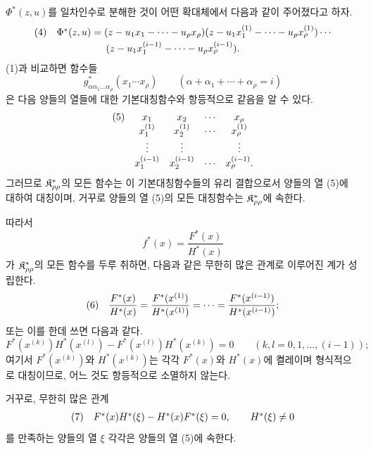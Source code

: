 $\Phi^*(z,u)$를 일차인수로 분해한 것이 어떤 확대체에서 다음과 같이 주어졌다고 하자.
\[
\begin{array}{@{}l@{\quad}l@{}}
(4)& \Phi^*(z,u)=(z-u_1x_1-\cdots-u_\rho x_\rho)(z-u_1x_1^{(1)}-\cdots-u_\rho x_\rho^{(1)})\cdots\\[0.25em]
& \qquad\qquad\quad (z-u_1x_1^{(i-1)}-\cdots-u_\rho x_\rho^{(i-1)}).
\end{array}
\]
(1)과 비교하면 함수들
\[
g^*_{\alpha\alpha_1\ldots\alpha_\rho}(x_1\cdots x_\rho)\qquad(\alpha+\alpha_1+\cdots+\alpha_\rho=i)
\]
은 다음 양들의 열들에 대한 기본대칭함수와 항등적으로 같음을 알 수 있다.
\[
\begin{array}{@{}l@{\quad}cccc@{}}
(5)&x_1&x_2&\cdots&x_\rho\\
&x_1^{(1)}&x_2^{(1)}&\cdots&x_\rho^{(1)}\\
&\vdots&\vdots&&\vdots\\
&x_1^{(i-1)}&x_2^{(i-1)}&\cdots&x_\rho^{(i-1)}.
\end{array}
\]
그러므로 $\mathfrak K^*_{\rho\rho}$의 모든 함수는 이 기본대칭함수들의 유리 결합으로서 양들의 열 (5)에 대하여 대칭이며, 거꾸로 양들의 열 (5)의 모든 대칭함수는 $\mathfrak K^*_{\rho\rho}$에 속한다.

따라서
\[
f^*(x)=\frac{F^*(x)}{H^*(x)}
\]
가 $\mathfrak K^*_{\rho\rho}$의 모든 함수를 두루 취하면, 다음과 같은 무한히 많은 관계로 이루어진 계가 성립한다.
\[
\begin{array}{@{}l@{\quad}c@{}}
(6)&\displaystyle \frac{F^*(x)}{H^*(x)}=\frac{F^*(x^{(1)})}{H^*(x^{(1)})}=\cdots=\frac{F^*(x^{(i-1)})}{H^*(x^{(i-1)})};
\end{array}
\]
또는 이를 한데 쓰면 다음과 같다.
\[
F^*(x^{(k)})H^*(x^{(l)})-F^*(x^{(l)})H^*(x^{(k)})=0\qquad(k,l=0,1,\ldots,(i-1));
\]
여기서 $F^*(x^{(k)})$와 $H^*(x^{(k)})$는 각각 $F^*(x)$와 $H^*(x)$에 켤레이며 형식적으로 대칭이므로, 어느 것도 항등적으로 소멸하지 않는다.

거꾸로, 무한히 많은 관계
\[
\begin{array}{@{}l@{\quad}c@{}}
(7)&F^*(x)H^*(\xi)-H^*(x)F^*(\xi)=0,\qquad H^*(\xi)\ne0
\end{array}
\]
를 만족하는 양들의 열 $\xi$ 각각은 양들의 열 (5)에 속한다.

